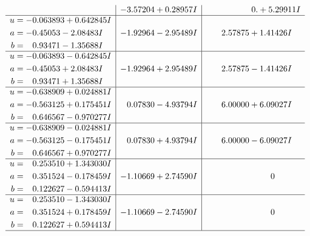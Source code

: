\documentclass[1p]{elsarticle_modified}
\theoremstyle{definition}
\begin{document}
$$\begin{array}{c|c|c}
 & -3.57204 + 0.28957 I & \phantom{-0.000000 -}0. + 5.29911 I \\ \hline\begin{aligned}
u &= -0.063893 + 0.642845 I \\
a &= -0.45053 - 2.08483 I \\
b &= \phantom{-}0.93471 - 1.35688 I\end{aligned}
 & -1.92964 - 2.95489 I & \phantom{-}2.57875 + 1.41426 I \\ \hline\begin{aligned}
u &= -0.063893 - 0.642845 I \\
a &= -0.45053 + 2.08483 I \\
b &= \phantom{-}0.93471 + 1.35688 I\end{aligned}
 & -1.92964 + 2.95489 I & \phantom{-}2.57875 - 1.41426 I \\ \hline\begin{aligned}
u &= -0.638909 + 0.024881 I \\
a &= -0.563125 + 0.175451 I \\
b &= \phantom{-}0.646567 - 0.970277 I\end{aligned}
 & \phantom{-}0.07830 - 4.93794 I & \phantom{-}6.00000 + 6.09027 I \\ \hline\begin{aligned}
u &= -0.638909 - 0.024881 I \\
a &= -0.563125 - 0.175451 I \\
b &= \phantom{-}0.646567 + 0.970277 I\end{aligned}
 & \phantom{-}0.07830 + 4.93794 I & \phantom{-}6.00000 - 6.09027 I \\ \hline\begin{aligned}
u &= \phantom{-}0.253510 + 1.343030 I \\
a &= \phantom{-}0.351524 - 0.178459 I \\
b &= \phantom{-}0.122627 - 0.594413 I\end{aligned}
 & -1.10669 + 2.74590 I & \phantom{-0.000000 } 0 \\ \hline\begin{aligned}
u &= \phantom{-}0.253510 - 1.343030 I \\
a &= \phantom{-}0.351524 + 0.178459 I \\
b &= \phantom{-}0.122627 + 0.594413 I\end{aligned}
 & -1.10669 - 2.74590 I & \phantom{-0.000000 } 0\\
 \hline 
 \end{array}$$\newpage$$\begin{array}{c|c|c}  

\end{array}$$
\end{document}
